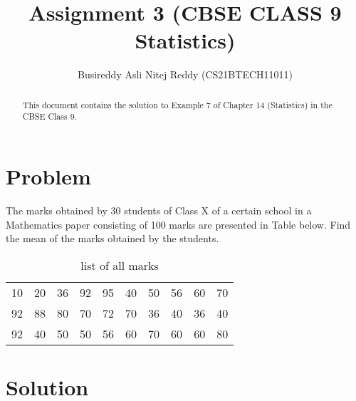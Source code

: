 \documentclass[journal,12pt,twocolumn]{IEEEtran}
\title{Assignment 3 (CBSE CLASS 9 Statistics) }
\author{Busireddy Asli Nitej Reddy (CS21BTECH11011)}
\date{}
\begin{document}
\maketitle

\begin{abstract}
This document contains the solution to Example 7 of Chapter 14 (Statistics) in the CBSE Class 9.
\end{abstract}

\section*{\textbf{Problem}}
     
        The marks obtained by 30 students of Class X of a certain school in a Mathematics paper consisting of 100 marks are presented in Table below. Find the mean of the marks obtained by the students.
        
       \begin{table}[!ht]
            \centering
            \resizebox{\columnwidth}{!}
            {
                \begin{tabular}{c c c c c c c c c c}
                  10 &20 &36 &92 &95 &40 &50 &56 &60 &70\\
                  92 &88 &80 &70 &72 &70 &36 &40 &36 &40\\
                  92 &40 &50 &50 &56 &60 &70 &60 &60 &80\\
                \end{tabular}
            }
            \caption{list of all marks}
            \label{table:table1}
       \end{table}

\section*{\textbf{Solution}}
       
\end{document}
